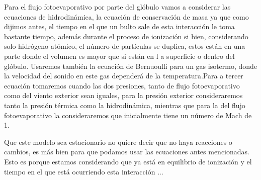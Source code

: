 \documentclass{article}
\begin{document}
Para el flujo fotoevaporativo por parte del glóbulo vamos a considerar las ecuaciones de hidrodinámica, la ecuación de conservación de masa ya que como dijimos antes, el tiempo en el que un bulto sale de esta interacción le toma bastante tiempo, además durante el proceso de ionización si bien, considerando solo hidrógeno atómico, el número de partículas se duplica, estos están en una parte donde el volumen es mayor que si están en l a superficie o dentro del glóbulo. Usaremos también la ecuación de Bernuoulli para un gas isotermo, donde la velocidad del sonido en este gas dependerá de la temperatura.Para a tercer ecuación tomaremos cuando las dos presiones, tanto de flujo fotoevaporativo como del viento exterior sean iguales, para la presión exterior consideraremos tanto la presión térmica como la hidrodinámica, mientras que para la del flujo fotoevaporativo la consideraremos que inicialmente tiene un número de Mach de 1.


Que este modelo sea estacionario no quiere decir que no haya reacciones o cambios, es más bien para que podamos usar las ecuaciones antes mencionadas. Esto es porque estamos considerando que ya está en equilibrio de ionización y el tiempo en el que está ocurriendo esta interacción ...
\end{document}
